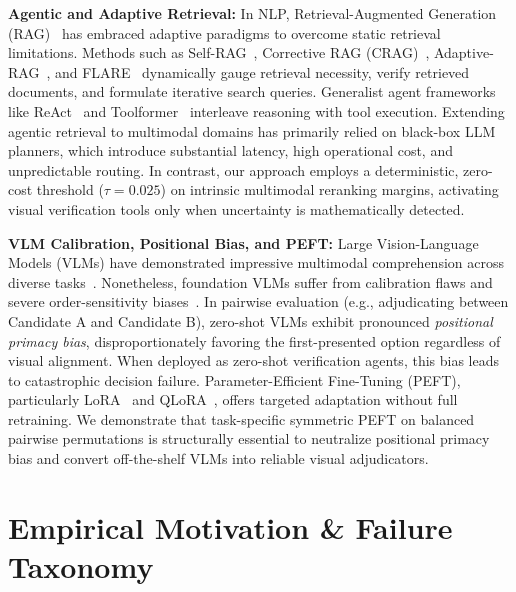 \documentclass[conference]{IEEEtran}
\begin{document}
\textbf{Agentic and Adaptive Retrieval:} In NLP, Retrieval-Augmented Generation (RAG)~\cite{lewis2020rag} has embraced adaptive paradigms to overcome static retrieval limitations. Methods such as Self-RAG~\cite{selfrag}, Corrective RAG (CRAG)~\cite{crag}, Adaptive-RAG~\cite{adaptiverag}, and FLARE~\cite{jiang2023flare} dynamically gauge retrieval necessity, verify retrieved documents, and formulate iterative search queries. Generalist agent frameworks like ReAct~\cite{react} and Toolformer~\cite{toolformer} interleave reasoning with tool execution. Extending agentic retrieval to multimodal domains has primarily relied on black-box LLM planners, which introduce substantial latency, high operational cost, and unpredictable routing. In contrast, our approach employs a deterministic, zero-cost threshold ($\tau = 0.025$) on intrinsic multimodal reranking margins, activating visual verification tools only when uncertainty is mathematically detected.

\textbf{VLM Calibration, Positional Bias, and PEFT:} Large Vision-Language Models (VLMs) have demonstrated impressive multimodal comprehension across diverse tasks~\cite{llava15, blip2}. Nonetheless, foundation VLMs suffer from calibration flaws and severe order-sensitivity biases~\cite{primacy_bias, peiss_order_bias}. In pairwise evaluation (e.g., adjudicating between Candidate A and Candidate B), zero-shot VLMs exhibit pronounced \textit{positional primacy bias}, disproportionately favoring the first-presented option regardless of visual alignment. When deployed as zero-shot verification agents, this bias leads to catastrophic decision failure. Parameter-Efficient Fine-Tuning (PEFT), particularly LoRA~\cite{lora} and QLoRA~\cite{qlora}, offers targeted adaptation without full retraining. We demonstrate that task-specific symmetric PEFT on balanced pairwise permutations is structurally essential to neutralize positional primacy bias and convert off-the-shelf VLMs into reliable visual adjudicators.


\section{Empirical Motivation \& Failure Taxonomy}
\end{document}
